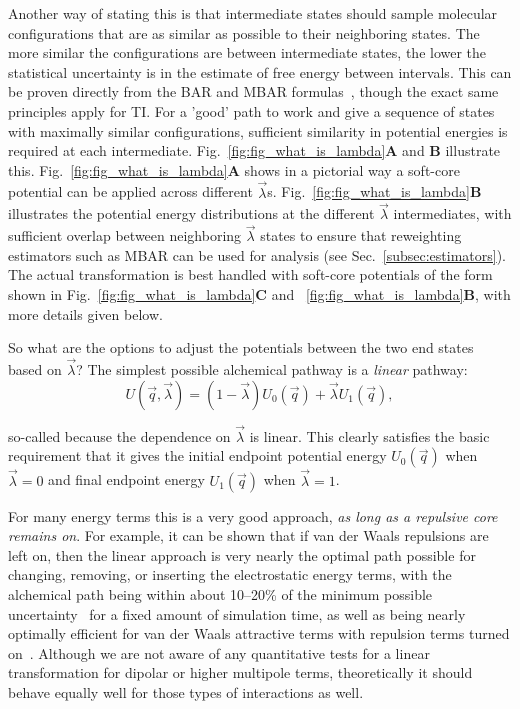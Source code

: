 \documentclass[9pt,bestpractices]{livecoms}
\begin{document}
Another way of stating this is that intermediate states should sample molecular configurations that are as similar as possible to their neighboring states. The more similar the configurations are between intermediate states, the lower the statistical uncertainty is in the estimate of free energy between intervals. This can be proven directly from the BAR and MBAR formulas~\cite{bennett1976efficient,klimovich2015guidelines}, though the exact same principles apply for TI. For a 'good' path to work and give a sequence of states with maximally similar configurations, sufficient similarity in potential energies is required at each intermediate. Fig.~\ref{fig:fig_what_is_lambda}\textbf{A} and \textbf{B} illustrate this. Fig.~\ref{fig:fig_what_is_lambda}\textbf{A} shows in a pictorial way a soft-core potential can be applied across different $\vec{\lambda}$s. Fig.~\ref{fig:fig_what_is_lambda}\textbf{B} illustrates the potential energy distributions at the different $\vec{\lambda}$ intermediates, with sufficient overlap between neighboring $\vec{\lambda}$ states to ensure that reweighting estimators such as MBAR can be used for analysis (see Sec.~\ref{subsec:estimators}). The actual transformation is best handled with soft-core potentials of the form shown in Fig.~\ref{fig:fig_what_is_lambda}\textbf{C} and ~\ref{fig:fig_what_is_lambda}\textbf{B}, with more details given below. 

So what are the options to adjust the potentials between the two end states based on $\vec{\lambda}$? The simplest possible alchemical pathway is a \textit{linear} pathway:
\begin{equation}
U(\vec{q},\vec{\lambda}) = (1-\vec{\lambda}) U_0(\vec{q}) + \vec{\lambda}U_1(\vec{q}), \end{equation}

so-called because the dependence on $\vec{\lambda}$ is linear. This clearly satisfies the basic requirement that it gives the initial endpoint potential energy $U_0(\vec{q})$ when $\vec{\lambda}=0$ and final endpoint energy $U_1(\vec{q})$ when $\vec{\lambda}=1$. 

For many energy terms this is a very good approach, \textit{as long as a repulsive core remains on}. For example, it can be shown that if van der Waals repulsions are left on, then the linear approach is very nearly the optimal path possible for changing, removing, or inserting the electrostatic energy terms, with the alchemical path being within about 10--20\% of the minimum possible uncertainty~\cite{naden2015linear} for a fixed amount of simulation time, as well as being nearly optimally efficient for van der Waals attractive terms with repulsion terms turned on~\cite{naden2014linear}. Although we are not aware of any quantitative tests for a linear transformation for dipolar or higher multipole terms, theoretically it should behave equally well for those types of interactions as well.
\end{document}
